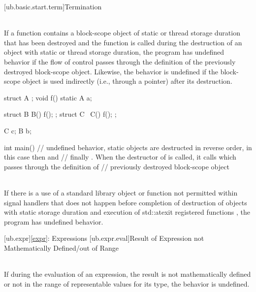 [ub.basic.start.term]{Termination}

\pnum
{} \\
If a function contains a block-scope object of static or thread storage duration that has been destroyed and the
function is called during the destruction of an object with static or thread storage duration, the program has
undefined behavior if the flow of control passes through the definition of the previously destroyed block-scope
object. Likewise, the behavior is undefined if the block-scope object is used indirectly (i.e., through a pointer)
after its destruction.

\pnum
\begin{example}
\begin{codeblock}
struct A {};
void f() {
  static A a;
}

struct B {
  B() { f(); }
};
struct C {
  ~C() { f(); }
};

C c;
B b;

int main() {}
// undefined behavior, static objects are destructed in reverse order, in this case  then  and
// finally . When the destructor of  is called, it calls  which passes through the definition of
// previously destroyed block-scope object
\end{codeblock}
\end{example}


\pnum
{} \\
If there is a use of a standard library object or function not permitted within signal handlers  that
does not happen before  completion of destruction of objects with static storage duration and execution
of std::atexit registered functions , the program has undefined behavior.

\pnum
\begin{example}
\begin{codeblock}
\end{codeblock}
\end{example}


[ub.expr]{\ref{expr}: Expressions}
[ub.expr.eval]{Result of Expression not Mathematically Defined/out of Range}

\pnum
{} \\
If during the evaluation of an expression, the result is not mathematically defined or not in the range of
representable values for its type, the behavior is undefined.


